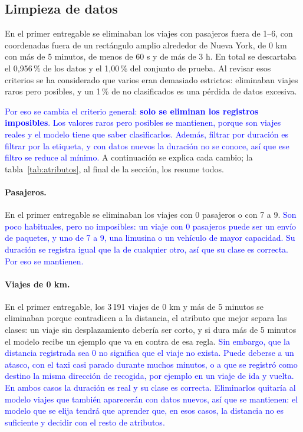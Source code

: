 \documentclass[12pt,a4paper]{article}
\newcommand{\cambio}[1]{\textcolor{blue}{#1}}
\begin{document}
\subsection{Limpieza de datos}
\label{sec:limpieza}

En el primer entregable se eliminaban los viajes con pasajeros fuera de 1--6, con coordenadas fuera de un rectángulo amplio alrededor de Nueva York, de 0 km con más de 5 minutos, de menos de 60 s y de más de 3 h. En total se descartaba el 0,956\,\% de los datos y el 1,00\,\% del conjunto de prueba. Al revisar esos criterios se ha considerado que varios eran demasiado estrictos: eliminaban viajes raros pero posibles, y un 1\,\% de no clasificados es una pérdida de datos excesiva.

\cambio{Por eso se cambia el criterio general: \textbf{solo se eliminan los registros imposibles}. Los valores raros pero posibles se mantienen, porque son viajes reales y el modelo tiene que saber clasificarlos. Además, filtrar por duración es filtrar por la etiqueta, y con datos nuevos la duración no se conoce, así que ese filtro se reduce al mínimo.} A continuación se explica cada cambio; la tabla~\ref{tab:atributos}, al final de la sección, los resume todos.

\paragraph{Pasajeros.} En el primer entregable se eliminaban los viajes con 0 pasajeros o con 7 a 9. \cambio{Son poco habituales, pero no imposibles: un viaje con 0 pasajeros puede ser un envío de paquetes, y uno de 7 a 9, una limusina o un vehículo de mayor capacidad. Su duración se registra igual que la de cualquier otro, así que su clase es correcta. Por eso se mantienen.}

\paragraph{Viajes de 0 km.} En el primer entregable, los 3\,191 viajes de 0 km y más de 5 minutos se eliminaban porque contradicen a la distancia, el atributo que mejor separa las clases: un viaje sin desplazamiento debería ser corto, y si dura más de 5 minutos el modelo recibe un ejemplo que va en contra de esa regla. \cambio{Sin embargo, que la distancia registrada sea 0 no significa que el viaje no exista. Puede deberse a un atasco, con el taxi casi parado durante muchos minutos, o a que se registró como destino la misma dirección de recogida, por ejemplo en un viaje de ida y vuelta. En ambos casos la duración es real y su clase es correcta. Eliminarlos quitaría al modelo viajes que también aparecerán con datos nuevos, así que se mantienen: el modelo que se elija tendrá que aprender que, en esos casos, la distancia no es suficiente y decidir con el resto de atributos.}
\end{document}
